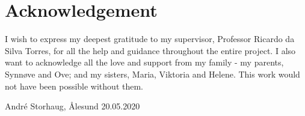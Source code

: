 \section*{Acknowledgement}
I wish to express my deepest gratitude to my supervisor, Professor Ricardo da Silva Torres, for all the help and guidance throughout the entire project. I also want to acknowledge all the love and support from my family - my parents, Synnøve and Ove; and my sisters, Maria, Viktoria and Helene. This work would not have been possible without them.
\begin{flushright}
    André Storhaug, \r{A}lesund 20.05.2020
\end{flushright}